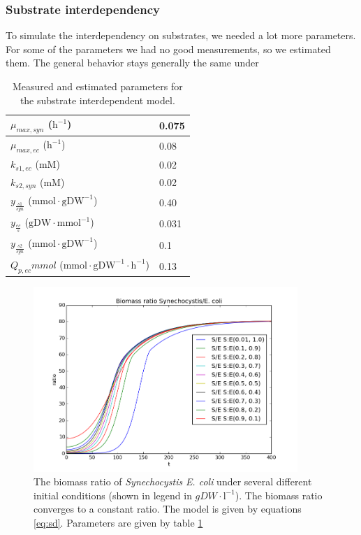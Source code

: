\documentclass[12pt]{report}
\begin{document}
\pagebreak
\newpage
\subsubsection{Substrate interdependency}
To simulate the interdependency on substrates, we needed a lot more parameters. For some of the parameters we had no good measurements, so we estimated them. The general behavior stays generally the same under

\begin{table}[!ht]
 \begin{center}  
  \begin{tabular}{|l|l|}
   \hline
   $\mu_{max,syn}$ ($\text{h}^{-1}$) & 0.075 \\ \hline
   $\mu_{max,ec}$ ($\text{h}^{-1}$) & 0.08 \\ \hline
   $k_{s1,ec}$ ($\text{mM}$) & 0.02 \\ \hline
   $k_{s2,syn}$ ($\text{mM}$) & 0.02 \\ \hline
   $y_{\frac{s1}{syn}}$ ($\text{mmol}\cdot\text{gDW}^{-1}$) & 0.40 \\ \hline
   $y_{\frac{ec}{s}}$ ($\text{gDW}\cdot\text{mmol}^{-1}$) & 0.031 \\ \hline
   $y_{\frac{s2}{syn}}$ ($\text{mmol}\cdot\text{gDW}^{-1}$) & 0.1 \\ \hline
   $Q_{p,ec} mmol$ ($\text{mmol}\cdot \text{gDW}^{-1}\cdot\text{h}^{-1}$) & 0.13 \\
   \hline   
  \end{tabular}
  \caption{Measured and estimated parameters for the substrate interdependent model.}
  \label{tab:sdp}
 \end{center}
\end{table}


\begin{figure}[!ht]
 \begin{center}  
     \includegraphics[width=10cm]{ratios_interdependent_1.png}
     \caption{The biomass ratio of \textit{Synechocystis} \textit{E. coli} under several different initial conditions (shown in legend in $gDW\cdot \text{l}^{-1}$). The biomass ratio converges to a constant ratio. The model is given by equations \ref{eq:sd}. Parameters are given by table \ref{tab:sdp}}
    \label{fig:subrat}
    \end{center}
\end{figure}
\end{document}
